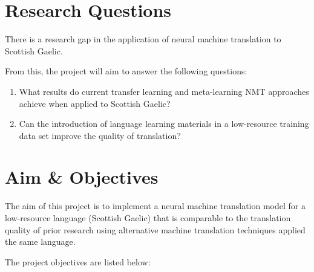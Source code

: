 
\section{Research Questions}
There is a research gap in the application of neural machine translation to Scottish Gaelic.

From this, the project will aim to answer the following questions:

\begin{enumerate}
    \item What results do current transfer learning and meta-learning NMT approaches achieve when applied to Scottish Gaelic?
    \item Can the introduction of language learning materials in a low-resource training data set improve the quality of translation?
\end{enumerate}


\section{Aim \& Objectives}
The aim of this project is to implement a neural machine translation model for a low-resource language (Scottish Gaelic) that is comparable to the translation quality of prior research using alternative machine translation techniques applied the same language.

The project objectives are listed below:

